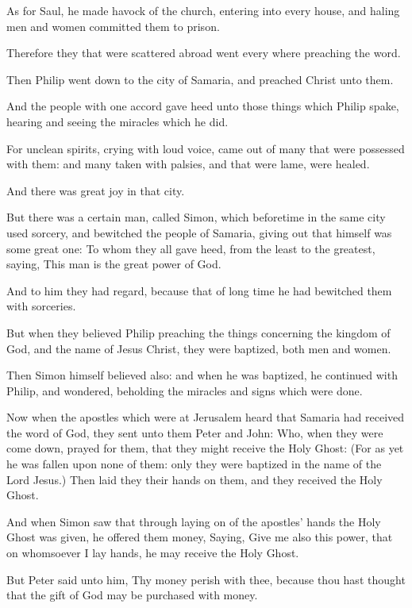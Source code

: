 \Verse As for Saul, he made havock of the church, entering into every house, and haling men and women committed them to prison.

\Verse Therefore they that were scattered abroad went every where preaching the word.

\Verse Then Philip went down to the city of Samaria, and preached Christ unto them.

\Verse And the people with one accord gave heed unto those things which Philip spake, hearing and seeing the miracles which he did.

\Verse For unclean spirits, crying with loud voice, came out of many that were possessed with them: and many taken with palsies, and that were lame, were healed.

\Verse And there was great joy in that city.

\Verse But there was a certain man, called Simon, which beforetime in the same city used sorcery, and bewitched the people of Samaria, giving out that himself was some great one: \Verse To whom they all gave heed, from the least to the greatest, saying, This man is the great power of God.

\Verse And to him they had regard, because that of long time he had bewitched them with sorceries.

\Verse But when they believed Philip preaching the things concerning the kingdom of God, and the name of Jesus Christ, they were baptized, both men and women.

\Verse Then Simon himself believed also: and when he was baptized, he continued with Philip, and wondered, beholding the miracles and signs which were done.

\Verse Now when the apostles which were at Jerusalem heard that Samaria had received the word of God, they sent unto them Peter and John: \Verse Who, when they were come down, prayed for them, that they might receive the Holy Ghost: \Verse (For as yet he was fallen upon none of them: only they were baptized in the name of the Lord Jesus.)  \Verse Then laid they their hands on them, and they received the Holy Ghost.

\Verse And when Simon saw that through laying on of the apostles' hands the Holy Ghost was given, he offered them money, \Verse Saying, Give me also this power, that on whomsoever I lay hands, he may receive the Holy Ghost.

\Verse But Peter said unto him, Thy money perish with thee, because thou hast thought that the gift of God may be purchased with money.

